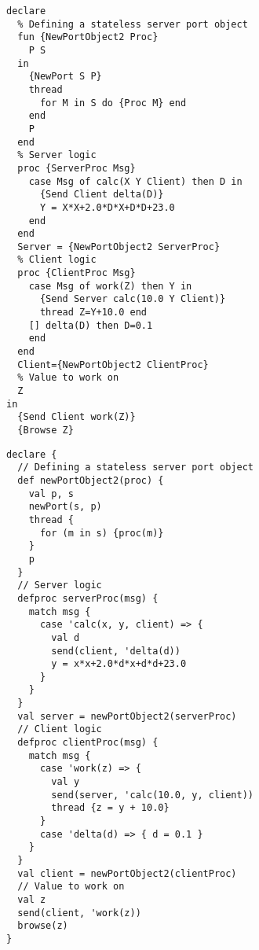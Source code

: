 \begin{lstlisting}[language=oz,label={lst:lstexamplermioz},title={RMI with callback : a message passing program example (\textit{Oz} version)}]
declare
  % Defining a stateless server port object
  fun {NewPortObject2 Proc}
    P S
  in
    {NewPort S P}
    thread
      for M in S do {Proc M} end
    end
    P
  end
  % Server logic
  proc {ServerProc Msg}
    case Msg of calc(X Y Client) then D in
      {Send Client delta(D)}
      Y = X*X+2.0*D*X+D*D+23.0
    end
  end
  Server = {NewPortObject2 ServerProc}
  % Client logic
  proc {ClientProc Msg}
    case Msg of work(Z) then Y in
      {Send Server calc(10.0 Y Client)}
      thread Z=Y+10.0 end
    [] delta(D) then D=0.1
    end
  end
  Client={NewPortObject2 ClientProc}
  % Value to work on
  Z
in
  {Send Client work(Z)}
  {Browse Z}
\end{lstlisting}
\begin{lstlisting}[language=newoz,label={lst:lstexamplerminewoz},title={RMI with callback : a message passing program example (\textit{NewOz} version)}]
declare {
  // Defining a stateless server port object
  def newPortObject2(proc) {
    val p, s
    newPort(s, p)
    thread {
      for (m in s) {proc(m)}
    }
    p
  }
  // Server logic
  defproc serverProc(msg) {
    match msg {
      case 'calc(x, y, client) => {
        val d
        send(client, 'delta(d))
        y = x*x+2.0*d*x+d*d+23.0
      }
    }
  }
  val server = newPortObject2(serverProc)
  // Client logic
  defproc clientProc(msg) {
    match msg {
      case 'work(z) => {
        val y
        send(server, 'calc(10.0, y, client))
        thread {z = y + 10.0}
      }
      case 'delta(d) => { d = 0.1 }
    }
  }
  val client = newPortObject2(clientProc)
  // Value to work on
  val z
  send(client, 'work(z))
  browse(z)
}
\end{lstlisting}
